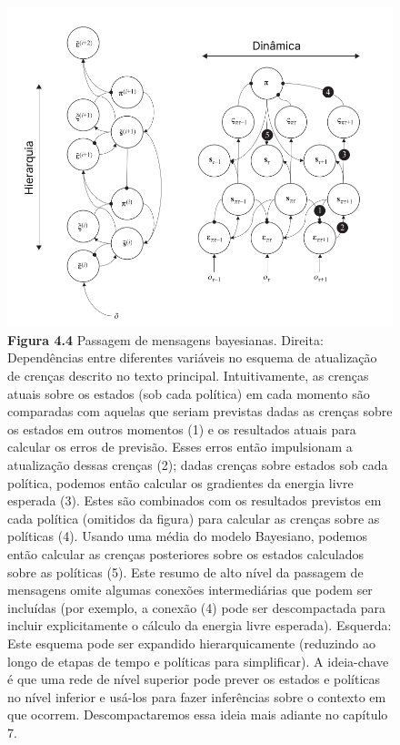 \documentclass[
  12pt,
]{book}
\begin{document}
\begin{figure}
\centering
\includegraphics{images/Figura_4_4.png}
\caption{\textbf{Figura 4.4} Passagem de mensagens bayesianas. Direita: Dependências
entre diferentes variáveis \hspace{0pt}\hspace{0pt}no esquema de atualização de crenças
descrito no texto principal. Intuitivamente, as crenças atuais sobre os
estados (sob cada política) em cada momento são comparadas com aquelas
que seriam previstas dadas as crenças sobre os estados em outros
momentos (1) e os resultados atuais para calcular os erros de previsão.
Esses erros então impulsionam a atualização dessas crenças (2); dadas
crenças sobre estados sob cada política, podemos então calcular os
gradientes da energia livre esperada (3). Estes são combinados com os
resultados previstos em cada política (omitidos da figura) para calcular
as crenças sobre as políticas (4). Usando uma média do modelo Bayesiano,
podemos então calcular as crenças posteriores sobre os estados
calculados sobre as políticas (5). Este resumo de alto nível da passagem
de mensagens omite algumas conexões intermediárias que podem ser
incluídas (por exemplo, a conexão (4) pode ser descompactada para
incluir explicitamente o cálculo da energia livre esperada). Esquerda:
Este esquema pode ser expandido hierarquicamente (reduzindo ao longo de
etapas de tempo e políticas para simplificar). A ideia-chave é que uma
rede de nível superior pode prever os estados e políticas no nível
inferior e usá-los para fazer inferências sobre o contexto em que
ocorrem. Descompactaremos essa ideia mais adiante no capítulo
7.}
\end{figure}
\end{document}

